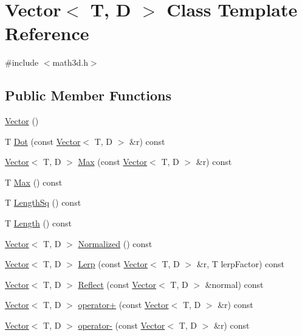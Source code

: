 \hypertarget{class_vector}{}\section{Vector$<$ T, D $>$ Class Template Reference}
\label{class_vector}


{\ttfamily \#include $<$math3d.\+h$>$}

\subsection*{Public Member Functions}
\begin{DoxyCompactItemize}
\item 
\hyperlink{class_vector_a3c785a9866bb20fc79b19196fe9b3a5b}{Vector} ()
\item 
T \hyperlink{class_vector_a70c3348b3fcab9e06f120b8e7a9b0a40}{Dot} (const \hyperlink{class_vector}{Vector}$<$ T, D $>$ \&r) const 
\item 
\hyperlink{class_vector}{Vector}$<$ T, D $>$ \hyperlink{class_vector_adb18e41faad27d9cef7a4629b6fe53b9}{Max} (const \hyperlink{class_vector}{Vector}$<$ T, D $>$ \&r) const 
\item 
T \hyperlink{class_vector_a428af4a05c03660f55cddb78696c2d38}{Max} () const 
\item 
T \hyperlink{class_vector_a197762230f85ba8e0ce7460dfa0000df}{Length\+Sq} () const 
\item 
T \hyperlink{class_vector_a68702092267c728db02f67c518c9583f}{Length} () const 
\item 
\hyperlink{class_vector}{Vector}$<$ T, D $>$ \hyperlink{class_vector_a42dc6fba30ea0f61e3dbf1031876d539}{Normalized} () const 
\item 
\hyperlink{class_vector}{Vector}$<$ T, D $>$ \hyperlink{class_vector_aa78265179b17460e314b8931f498974c}{Lerp} (const \hyperlink{class_vector}{Vector}$<$ T, D $>$ \&r, T lerp\+Factor) const 
\item 
\hyperlink{class_vector}{Vector}$<$ T, D $>$ \hyperlink{class_vector_a4a4933d141bf4bf006f12738538fa0c9}{Reflect} (const \hyperlink{class_vector}{Vector}$<$ T, D $>$ \&normal) const 
\item 
\hyperlink{class_vector}{Vector}$<$ T, D $>$ \hyperlink{class_vector_a26e7de8248521c9c943901ab197e0382}{operator+} (const \hyperlink{class_vector}{Vector}$<$ T, D $>$ \&r) const 
\item 
\hyperlink{class_vector}{Vector}$<$ T, D $>$ \hyperlink{class_vector_af24d7aceedbf168d05e692d88d46fae1}{operator-\/} (const \hyperlink{class_vector}{Vector}$<$ T, D $>$ \&r) const 

\end{DoxyCompactItemize}
